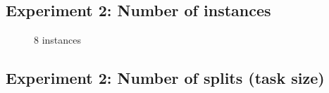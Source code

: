 \documentclass[11pt,a4paper]{article}
\begin{document}
\subsection{Experiment 2: Number of instances}

\begin{figure}[htp]
    \centering
    
    \caption{8 instances}
    \label{fig:histo_instance}
\end{figure}

\subsection{Experiment 2: Number of splits (task size)}
\end{document}
